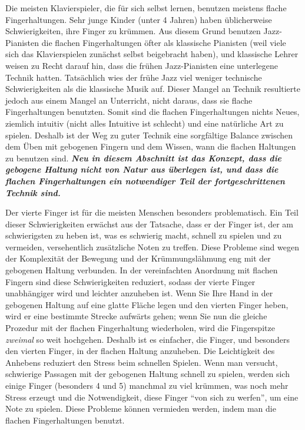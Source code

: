 Die meisten Klavierspieler, die für sich selbst lernen, benutzen meistens flache Fingerhaltungen.
Sehr junge Kinder (unter 4 Jahren) haben üblicherweise Schwierigkeiten, ihre Finger zu krümmen.
Aus diesem Grund benutzen Jazz-Pianisten die flachen Fingerhaltungen öfter als klassische Pianisten (weil viele sich das Klavierspielen zunächst selbst beigebracht haben), und klassische Lehrer weisen zu Recht darauf hin, dass die frühen Jazz-Pianisten eine unterlegene Technik hatten.
Tatsächlich wies der frühe Jazz viel weniger technische Schwierigkeiten als die klassische Musik auf.
Dieser Mangel an Technik resultierte jedoch aus einem Mangel an Unterricht, nicht daraus, dass sie flache Fingerhaltungen benutzten.
Somit sind die flachen Fingerhaltungen nichts Neues, ziemlich intuitiv (nicht alles Intuitive ist schlecht) und eine natürliche Art zu spielen.
Deshalb ist der Weg zu guter Technik eine sorgfältige Balance zwischen dem Üben mit gebogenen Fingern und dem Wissen, wann die flachen Haltungen zu benutzen sind.
\textbf{\textit{Neu in diesem Abschnitt ist das Konzept, dass die gebogene Haltung nicht von Natur aus überlegen ist, und dass die flachen Fingerhaltungen ein notwendiger Teil der fortgeschrittenen Technik sind.}}

Der vierte Finger ist für die meisten Menschen besonders problematisch.
Ein Teil dieser Schwierigkeiten erwächst aus der Tatsache, dass er der Finger ist, der am schwierigsten zu heben ist, was es schwierig macht, schnell zu spielen und zu vermeiden, versehentlich zusätzliche Noten zu treffen.
Diese Probleme sind wegen der Komplexität der Bewegung und der Krümmungslähmung eng mit der gebogenen Haltung verbunden.
In der vereinfachten Anordnung mit flachen Fingern sind diese Schwierigkeiten reduziert, sodass der vierte Finger unabhängiger wird und leichter anzuheben ist.
Wenn Sie Ihre Hand in der gebogenen Haltung auf eine glatte Fläche legen und den vierten Finger heben, wird er eine bestimmte Strecke aufwärts gehen; wenn Sie nun die gleiche Prozedur mit der flachen Fingerhaltung wiederholen, wird die Fingerspitze \textit{zweimal} so weit hochgehen.
Deshalb ist es einfacher, die Finger, und besonders den vierten Finger, in der flachen Haltung anzuheben.
Die Leichtigkeit des Anhebens reduziert den Stress beim schnellen Spielen.
Wenn man versucht, schwierige Passagen mit der gebogenen Haltung schnell zu spielen, werden sich einige Finger (besonders 4 und 5) manchmal zu viel krümmen, was noch mehr Stress erzeugt und die Notwendigkeit, diese Finger \enquote{von sich zu werfen}, um eine Note zu spielen.
Diese Probleme können vermieden werden, indem man die flachen Fingerhaltungen benutzt.

